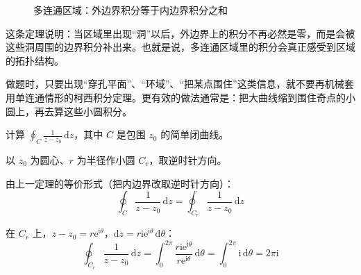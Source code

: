 \begin{figure}[htbp]
\centering
{}
\caption{多连通区域：外边界积分等于内边界积分之和}
\label{fig:multi-connected}
\end{figure}

\begin{tishi}[这条定理的意义和用法]
这条定理说明：当区域里出现``洞''以后，外边界上的积分不再必然是零，而是会被这些洞周围的边界积分补出来。也就是说，多连通区域里的积分会真正感受到区域的拓扑结构。

做题时，只要出现``穿孔平面''、``环域''、``把某点围住''这类信息，就不要再机械套用单连通情形的柯西积分定理。更有效的做法通常是：把大曲线缩到围住奇点的小圆上，再去算这些小圆积分。
\end{tishi}

\begin{lizi}{}{}
计算 $\displaystyle\oint_C \frac{1}{z - z_0}\,\mathrm{d}z$，其中 $C$ 是包围 $z_0$ 的简单闭曲线。

\begin{jie}
    以 $z_0$ 为圆心、$r$ 为半径作小圆 $C_r$，取逆时针方向。
    
    由上一定理的等价形式（把内边界改取逆时针方向）：
    \begin{equation}
        \oint_C \frac{1}{z - z_0}\,\mathrm{d}z = \oint_{C_r} \frac{1}{z - z_0}\,\mathrm{d}z
    \end{equation}
    
    在 $C_r$ 上，$z - z_0 = r\mathrm{e}^{\mathrm{i}\theta}$，$\mathrm{d}z = r\mathrm{i}\mathrm{e}^{\mathrm{i}\theta}\,\mathrm{d}\theta$：
    \begin{equation}
        \oint_{C_r} \frac{1}{z - z_0}\,\mathrm{d}z = \int_0^{2\pi} \frac{r\mathrm{i}\mathrm{e}^{\mathrm{i}\theta}}{r\mathrm{e}^{\mathrm{i}\theta}}\,\mathrm{d}\theta = \int_0^{2\pi} \mathrm{i}\,\mathrm{d}\theta = 2\pi\mathrm{i}
    \end{equation}
\end{jie}
\end{lizi}

